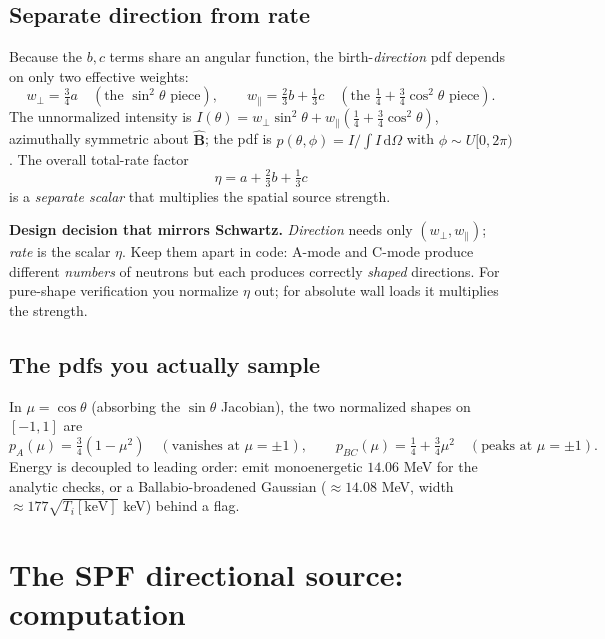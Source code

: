 \documentclass[11pt]{article}
\newcommand{\Bhat}{\hat{\mathbf{B}}}
\newcommand{\dd}{\,\mathrm{d}}
\begin{document}
\subsection{Separate direction from rate}
Because the $b,c$ terms share an angular function, the birth-\emph{direction} pdf depends on only
two effective weights:
\begin{equation}
w_\perp = \tfrac34 a \quad(\text{the }\sin^2\theta\text{ piece}),\qquad
w_\parallel = \tfrac23 b + \tfrac13 c \quad(\text{the }\tfrac14+\tfrac34\cos^2\theta\text{ piece}).
\end{equation}
The unnormalized intensity is $I(\theta)=w_\perp\sin^2\theta+w_\parallel(\tfrac14+\tfrac34\cos^2\theta)$,
azimuthally symmetric about $\Bhat$; the pdf is $p(\theta,\phi)=I/\!\int I\dd\Omega$ with
$\phi\sim U[0,2\pi)$. The overall total-rate factor
\begin{equation}
\eta = a + \tfrac23 b + \tfrac13 c
\end{equation}
is a \emph{separate scalar} that multiplies the spatial source strength.

\begin{key}
\textbf{Design decision that mirrors Schwartz.} \emph{Direction} needs only
$(w_\perp,w_\parallel)$; \emph{rate} is the scalar $\eta$. Keep them apart in code: A-mode and
C-mode produce different \emph{numbers} of neutrons but each produces correctly \emph{shaped}
directions. For pure-shape verification you normalize $\eta$ out; for absolute wall loads it
multiplies the strength.
\end{key}

\subsection{The pdfs you actually sample}
In $\mu=\cos\theta$ (absorbing the $\sin\theta$ Jacobian), the two normalized shapes on
$[-1,1]$ are
\begin{equation}
p_A(\mu) = \tfrac34(1-\mu^2)\quad(\text{vanishes at }\mu=\pm1),\qquad
p_{BC}(\mu) = \tfrac14 + \tfrac34\mu^2\quad(\text{peaks at }\mu=\pm1).
\end{equation}
Energy is decoupled to leading order: emit monoenergetic $14.06$ MeV for the analytic checks, or
a Ballabio-broadened Gaussian ($\approx 14.08$ MeV, width $\approx 177\sqrt{T_i[\text{keV}]}$ keV)
behind a flag.

\section{The SPF directional source: computation}
\label{sec:sampling}
\end{document}
